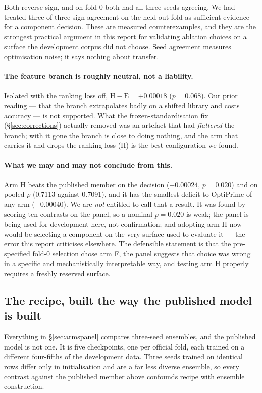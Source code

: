 \documentclass[11pt]{article}
\begin{document}
\noindent Both reverse sign, and on fold 0 both had all three seeds agreeing. We had treated
three-of-three sign agreement on the held-out fold as sufficient evidence for a component
decision. These are measured counterexamples, and they are the strongest practical argument
in this report for validating ablation choices on a surface the development corpus did not
choose. Seed agreement measures optimisation noise; it says nothing about transfer.

\paragraph{The feature branch is roughly neutral, not a liability.}
Isolated with the ranking loss off, $\mathrm{H}-\mathrm{E} = +0.00018$ ($p = 0.068$). Our
prior reading --- that the branch extrapolates badly on a shifted library and costs accuracy
--- is not supported. What the frozen-standardisation fix (\S\ref{sec:corrections}) actually
removed was an artefact that had \emph{flattered} the branch; with it gone the branch is
close to doing nothing, and the arm that carries it and drops the ranking loss (H) is the
best configuration we found.

\paragraph{What we may and may not conclude from this.}
Arm H beats the published member on the decision ($+0.00024$, $p = 0.020$) and on pooled
$\rho$ (0.7113 against 0.7091), and it has the smallest deficit to OptiPrime of any arm
($-0.00040$). We are \emph{not} entitled to call that a result. It was found by scoring ten
contrasts on the panel, so a nominal $p = 0.020$ is weak; the panel is being used for
development here, not confirmation; and adopting arm H now would be selecting a component on
the very surface used to evaluate it --- the error this report criticises elsewhere. The
defensible statement is that the pre-specified fold-0 selection chose arm F, the panel
suggests that choice was wrong in a specific and mechanistically interpretable way, and
testing arm H properly requires a freshly reserved surface.

\subsection{The recipe, built the way the published model is built}
\label{sec:perfold}

Everything in \S\ref{sec:armspanel} compares three-seed ensembles, and the published model is
not one. It is five checkpoints, one per official fold, each trained on a different
four-fifths of the development data. Three seeds trained on identical rows differ only in
initialisation and are a far less diverse ensemble, so every contrast against the published
member above confounds recipe with ensemble construction.
\end{document}
